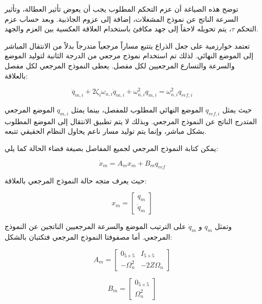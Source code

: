 توضح هذه الصياغة أن عزم التحكم المطلوب يجب أن يعوض تأثير العطالة، وتأثير السرعة الناتج عن نموذج المشغلات، إضافة إلى عزوم الجاذبية. وبعد حساب عزم التحكم \(\tau\)، يتم تحويله لاحقاً إلى جهد مكافئ باستخدام العلاقة العكسية بين العزم والجهد.

تعتمد خوارزمية  على جعل الذراع يتتبع مساراً مرجعياً متدرجاً بدلاً من الانتقال المباشر إلى الموضع النهائي. لذلك تم استخدام نموذج مرجعي من الدرجة الثانية لتوليد الموضع والسرعة والتسارع المرجعيين لكل مفصل. يعطى النموذج المرجعي لكل مفصل بالعلاقة:

\begin{equation}
\ddot{q}_{m,i}
+
2\zeta_i\omega_{n,i}\dot{q}_{m,i}
+
\omega_{n,i}^{2}q_{m,i}
=
\omega_{n,i}^{2}q_{ref,i}
\label{eq:actc_reference_model_single_joint}
\end{equation}

حيث يمثل \(q_{ref,i}\) الموضع النهائي المطلوب للمفصل، بينما يمثل \(q_{m,i}\) الموضع المرجعي المتدرج الناتج عن النموذج المرجعي. وبذلك لا يتم تطبيق الانتقال إلى الموضع المطلوب بشكل مباشر، وإنما يتم توليد مسار ناعم يحاول النظام الحقيقي تتبعه.

يمكن كتابة النموذج المرجعي لجميع المفاصل بصيغة فضاء الحالة كما يلي:

\begin{equation}
\dot{x}_m=A_m x_m+B_m q_{ref}
\label{eq:actc_reference_state_space}
\end{equation}

حيث يعرف متجه حالة النموذج المرجعي بالعلاقة:

\begin{equation}
x_m=
\begin{bmatrix}
q_m\\
\dot{q}_m
\end{bmatrix}
\label{eq:actc_reference_state_vector}
\end{equation}

وتمثل \(q_m\) و \(\dot{q}_m\) على الترتيب الموضع والسرعة المرجعيين الناتجين عن النموذج المرجعي. أما مصفوفتا النموذج المرجعي فتكتبان بالشكل:

\begin{equation}
A_m=
\begin{bmatrix}
0_{5\times5} & I_{5\times5}\\
-\Omega_n^2 & -2Z\Omega_n
\end{bmatrix}
\label{eq:actc_Am_matrix}
\end{equation}

\begin{equation}
B_m=
\begin{bmatrix}
0_{5\times5}\\
\Omega_n^2
\end{bmatrix}
\label{eq:actc_Bm_matrix}
\end{equation}

